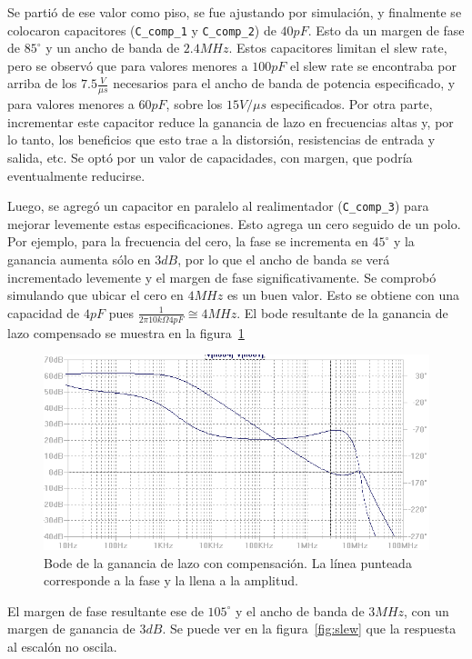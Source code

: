 Se partió de ese valor como piso, se fue ajustando por simulación, y finalmente se colocaron capacitores (\texttt{C\_comp\_1} y \texttt{C\_comp\_2}) de $40pF$. Esto da un margen de fase de $85^{\circ}$ y un ancho de banda de $2.4MHz$. Estos capacitores limitan el slew rate, pero se observó que para valores menores a $100pF$ el slew rate se encontraba por arriba de los $7.5\frac{V}{\mu s}$ necesarios para el ancho de banda de potencia especificado, y para valores menores a $60pF$, sobre los $15V/\mu s$ especificados. Por otra parte, incrementar este capacitor reduce la ganancia de lazo en frecuencias altas y, por lo tanto, los beneficios que esto trae a la distorsión, resistencias de entrada y salida, etc. Se optó por un valor de capacidades, con margen, que podría eventualmente reducirse.

Luego, se agregó un capacitor en paralelo al realimentador (\texttt{C\_comp\_3}) para mejorar levemente estas especificaciones. Esto agrega un cero seguido de un polo. Por ejemplo, para la frecuencia del cero, la fase se incrementa en $45^{\circ}$ y la ganancia aumenta sólo en $3dB$, por lo que el ancho de banda se verá incrementado levemente y el margen de fase significativamente. Se comprobó simulando que ubicar el cero en $4MHz$ es un buen valor. Esto se obtiene con una capacidad de $4pF$ pues $\frac{1}{2 \pi 10k\Omega 4pF}\cong 4MHz$. El bode resultante de la ganancia de lazo compensado se muestra en la figura~\ref{fig:bode-la-con-comp}

\begin{figure}[H]
	\centering
	\includegraphics[height=0.4\textwidth]{img/sim/bode-la-con-comp}
	\caption{Bode de la ganancia de lazo con compensación. La línea punteada corresponde a la fase y la llena a la amplitud.}
	\label{fig:bode-la-con-comp}
\end{figure}


El margen de fase resultante ese de $105^{\circ}$ y el ancho de banda de $3MHz$, con un margen de ganancia de $3dB$. Se puede ver en la figura~\ref{fig:slew} que la respuesta al escalón no oscila.

